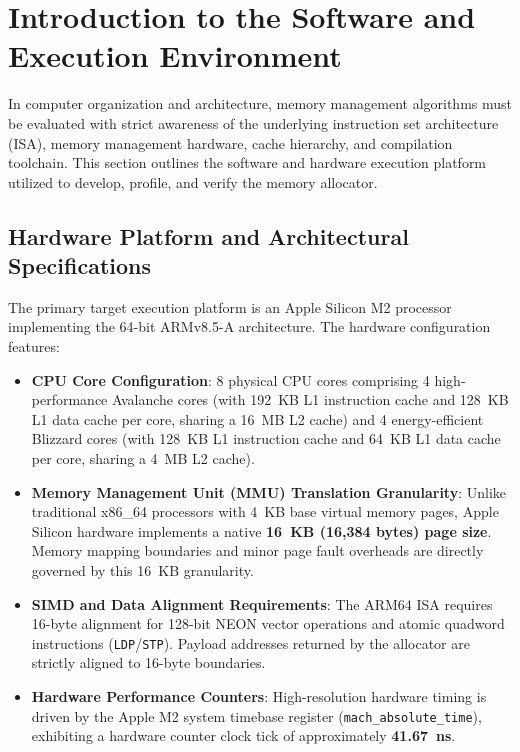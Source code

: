 \documentclass[a4paper,11pt]{report}
\begin{document}
\newpage
\tableofcontents
\newpage

\chapter{Introduction to the Software and Execution Environment}
\label{chap:emulator_env}

In computer organization and architecture, memory management algorithms must be evaluated with strict awareness of the underlying instruction set architecture (ISA), memory management hardware, cache hierarchy, and compilation toolchain. This section outlines the software and hardware execution platform utilized to develop, profile, and verify the memory allocator.

\section{Hardware Platform and Architectural Specifications}
The primary target execution platform is an Apple Silicon M2 processor implementing the 64-bit ARMv8.5-A architecture. The hardware configuration features:
\begin{itemize}
    \item \textbf{CPU Core Configuration}: 8 physical CPU cores comprising 4 high-performance Avalanche cores (with 192~KB L1 instruction cache and 128~KB L1 data cache per core, sharing a 16~MB L2 cache) and 4 energy-efficient Blizzard cores (with 128~KB L1 instruction cache and 64~KB L1 data cache per core, sharing a 4~MB L2 cache).
    \item \textbf{Memory Management Unit (MMU) Translation Granularity}: Unlike traditional x86\_64 processors with 4~KB base virtual memory pages, Apple Silicon hardware implements a native \textbf{16~KB (16,384 bytes) page size}. Memory mapping boundaries and minor page fault overheads are directly governed by this 16~KB granularity.
    \item \textbf{SIMD and Data Alignment Requirements}: The ARM64 ISA requires 16-byte alignment for 128-bit NEON vector operations and atomic quadword instructions (\texttt{LDP}/\texttt{STP}). Payload addresses returned by the allocator are strictly aligned to 16-byte boundaries.
    \item \textbf{Hardware Performance Counters}: High-resolution hardware timing is driven by the Apple M2 system timebase register (\texttt{mach\_absolute\_time}), exhibiting a hardware counter clock tick of approximately \textbf{41.67~ns}.
\end{itemize}
\end{document}
